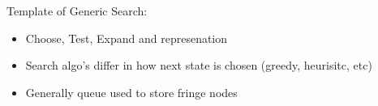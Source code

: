 \documentclass{article}
\begin{document}
    Template of Generic Search:
    \begin{itemize}
        \item Choose, Test, Expand and represenation
        \item Search algo's differ in how next state is chosen (greedy, heurisitc, etc)
        \item Generally queue used to store fringe nodes
    \end{itemize}

\printbibliography[title={Referências}]
\end{document}
